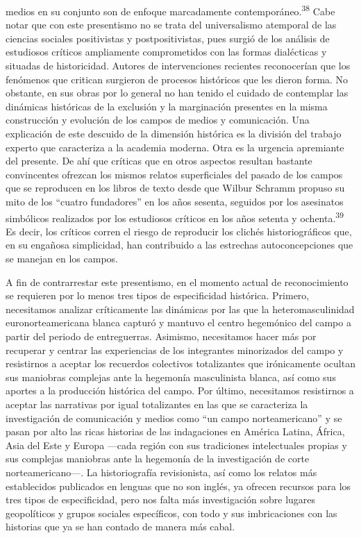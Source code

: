 \documentclass{tufte-handout}
\begin{document}
medios en su conjunto son de enfoque marcadamente
contemporáneo.\textsuperscript{38} Cabe notar que con este presentismo
no se trata del universalismo atemporal de las ciencias sociales
positivistas y postpositivistas, pues surgió de los análisis de
estudiosos críticos ampliamente comprometidos con las formas dialécticas
y situadas de historicidad. Autores de intervenciones recientes
reconocerían que los fenómenos que critican surgieron de procesos
históricos que les dieron forma. No obstante, en sus obras por lo
general no han tenido el cuidado de contemplar las dinámicas históricas
de la exclusión y la marginación presentes en la misma construcción y
evolución de los campos de medios y comunicación. Una explicación de
este descuido de la dimensión histórica es la división del trabajo
experto que caracteriza a la academia moderna. Otra es la urgencia
apremiante del presente. De ahí que críticas que en otros aspectos
resultan bastante convincentes ofrezcan los mismos relatos superficiales
del pasado de los campos que se reproducen en los libros de texto desde
que Wilbur Schramm propuso su mito de los ``cuatro fundadores'' en los
años sesenta, seguidos por los asesinatos simbólicos realizados por los
estudiosos críticos en los años setenta y ochenta.\textsuperscript{39} Es decir, los críticos corren el riesgo de
reproducir los clichés historiográficos que, en su engañosa simplicidad,
han contribuido a las estrechas autoconcepciones que se manejan en los
campos.

\enlargethispage{\baselineskip}

A fin de contrarrestar este presentismo, en el momento actual de
reconocimiento se requieren por lo menos tres tipos de especificidad
histórica. Primero, necesitamos analizar críticamente las dinámicas por
las que la heteromasculinidad euronorteamericana blanca capturó y
mantuvo el centro hegemónico del campo a partir del periodo de
entreguerras. Asimismo, necesitamos hacer más por recuperar y centrar
las experiencias de los integrantes minorizados del campo y resistirnos
a aceptar los recuerdos colectivos totalizantes que irónicamente ocultan
sus maniobras complejas ante la hegemonía masculinista blanca, así como
sus aportes a la producción histórica del campo. Por último, necesitamos
resistirnos a aceptar las narrativas por igual totalizantes en las que
se caracteriza la investigación de comunicación y medios como ``un campo
norteamericano'' y se pasan por alto las ricas historias de las
indagaciones en América Latina, África, Asia del Este y Europa ---cada
región con sus tradiciones intelectuales propias y sus complejas
maniobras ante la hegemonía de la investigación de corte
norteamericano---. La historiografía revisionista, así como los relatos
más establecidos publicados en lenguas que no son inglés, ya ofrecen
recursos para los tres tipos de especificidad, pero nos falta más
investigación sobre lugares geopolíticos y grupos sociales específicos,
con todo y sus imbricaciones con las historias que ya se han contado de
manera más cabal.
\end{document}
